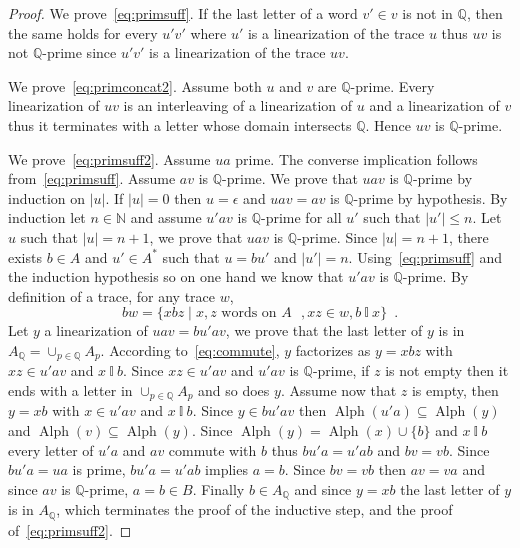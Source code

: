 \documentclass[a4paper,UKenglish]{lipics-v2016}
\newcommand{\NN}{\mathbb{N}}
\newcommand{\QQ}{\mathbb{Q}}
\newcommand{\ind}{~\mathbb{I}~}
\newcommand{\be}{\begin{equation}}
\newcommand{\ee}{\end{equation}}
\DeclareMathOperator{\alphabet}{Alph}
\begin{document}
\begin{proof}
We prove~\eqref{eq:primsuff}.
If the last letter of a word $v'\in v$
is not in $\QQ$, then the same holds for every $u'v'$ where $u'$ is a linearization of the trace $u$ thus $uv$ is not $\QQ$-prime since $u'v'$ is a linearization of the trace $uv$.


We prove~\eqref{eq:primconcat2}.
Assume both $u$ and $v$ are $\QQ$-prime.
Every linearization of $uv$ is an interleaving of a linearization
of $u$ and a linearization of $v$ thus it terminates with a letter
whose domain intersects $\QQ$. Hence $uv$ is $\QQ$-prime.

We prove~\eqref{eq:primsuff2}.
Assume $ua$ prime.
The converse implication follows from~\eqref{eq:primsuff}.
Assume $av$ is $\QQ$-prime.
We prove that $uav$ is $\QQ$-prime by induction on $|u|$.
If $|u|=0$ then $u=\epsilon$ and $uav=av$ is $\QQ$-prime by hypothesis.
By induction let $n\in \NN$ and assume $u'av$ is $\QQ$-prime
for all $u'$ such that $|u'|\leq n$. Let $u$ such that $|u|=n+1$,
we prove that $uav$ is $\QQ$-prime.
Since $|u|=n+1$,
there exists $b\in A$ and $u'\in A^*$
such that $u=bu'$ and $|u'|=n$.
Using~\eqref{eq:primsuff} and the induction hypothesis
so on one hand we know that $u'av$ is $\QQ$-prime.
By definition of a trace, for any trace $w$,
\be
\label{eq:commute}
bw =\{ xbz \mid x,z \text{ words on $A$ }, xz \in w, b\ind x\}\enspace.
\ee
Let $y$ a linearization of $uav=bu'av$,
we prove that the last letter of $y$ is in $A_\QQ=\cup_{p\in\QQ}A_p$.
According to~\eqref{eq:commute},
$y$ factorizes as $y=xbz$ with $xz\in u'av$ and $x\ind b$.
Since $xz\in u'av$ and $u'av$ is $\QQ$-prime,
if $z$ is not empty then it ends with a letter in $\cup_{p\in\QQ}A_p$ and so does $y$.
Assume now that $z$ is empty, then $y=xb$ with $x\in u'av$ and $x\ind b$.
Since $y\in bu'av$ then $\alphabet(u'a)\subseteq \alphabet(y)$
and $\alphabet(v)\subseteq \alphabet(y)$.
Since $\alphabet(y)=\alphabet(x)\cup \{b\}$
and $x\ind b$ every letter of $u'a$ and $av$ commute with $b$
thus $bu'a=u'ab$ and $bv = vb$.
Since $bu'a=ua$ is prime, $bu'a=u'ab$ implies $a=b$.
Since $bv=vb$ then $av=va$ and since $av$ is $\QQ$-prime, $a=b\in B$.
Finally $b\in A_\QQ$ and since $y=xb$ the last letter of $y$ is in $A_\QQ$,
which terminates the proof of the inductive step,
and the proof of~\eqref{eq:primsuff2}.






\end{proof}
\end{document}
